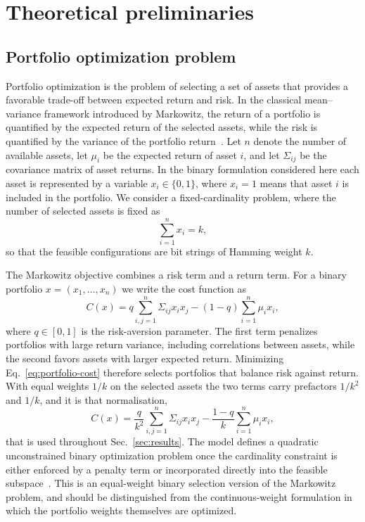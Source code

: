 \section{\label{sec:preliminaries}Theoretical preliminaries}

\subsection{Portfolio optimization problem}

Portfolio optimization is the problem of selecting a set of assets that provides a favorable trade-off between expected return and risk. In the classical mean--variance framework introduced by Markowitz, the return of a portfolio is quantified by the expected return of the selected assets, while the risk is quantified by the variance of the portfolio return~\cite{Markowitz1952,Markowitz1959}. Let $n$ denote the number of available assets, let $\mu_i$ be the expected return of asset $i$, and let $\Sigma_{ij}$ be the covariance matrix of asset returns. In the binary formulation considered here each asset is represented by a variable $x_i\in\{0,1\}$, where $x_i=1$ means that asset $i$ is included in the portfolio. We consider a fixed-cardinality problem, where the number of selected assets is fixed as
\begin{equation}
\sum_{i=1}^{n} x_i = k ,
    \label{eq:cardinality}
\end{equation}
so that the feasible configurations are bit strings of Hamming weight $k$.

The Markowitz objective combines a risk term and a return term. For a binary portfolio $x=(x_1,\ldots,x_n)$ we write the cost function as
\begin{equation}
C(x) = q \sum_{i,j=1}^{n} \Sigma_{ij} x_i x_j - (1-q)\sum_{i=1}^{n} \mu_i x_i ,
    \label{eq:portfolio-cost}
\end{equation}
where $q\in[0,1]$ is the risk-aversion parameter. The first term penalizes portfolios with large return variance, including correlations between assets, while the second favors assets with larger expected return. Minimizing Eq.~\eqref{eq:portfolio-cost} therefore selects portfolios that balance risk against return. With equal weights $1/k$ on the selected assets the two terms carry prefactors $1/k^{2}$ and $1/k$, and it is that normalisation,
\begin{equation}
C(x) = \frac{q}{k^{2}}\sum_{i,j=1}^{n}\Sigma_{ij}x_ix_j -\frac{1-q}{k}\sum_{i=1}^{n}\mu_ix_i ,
    \label{eq:portfolio-cost-normalised}
\end{equation}
that is used throughout Sec.~\ref{sec:results}. The model defines a quadratic unconstrained binary optimization problem once the cardinality constraint is either enforced by a penalty term or incorporated directly into the feasible subspace~\cite{Lucas2014,Venturelli2019}. This is an equal-weight binary selection version of the Markowitz problem, and should be distinguished from the continuous-weight formulation in which the portfolio weights themselves are optimized.


